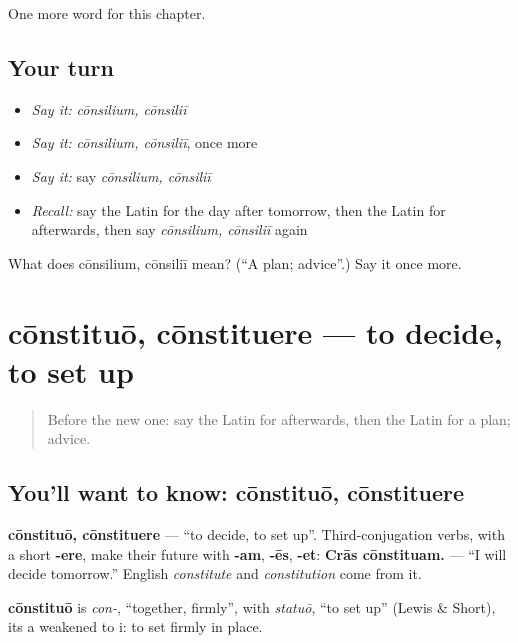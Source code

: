 \begin{grammarlens}[title={What you've built}]
One more word for this chapter.
\end{grammarlens}

\subsection*{Your turn}
\begin{itemize}
\raggedright
  \item \emph{Say it:} \emph{cōnsilium, cōnsiliī}
  \item \emph{Say it:} \emph{cōnsilium, cōnsiliī}, once more
  \item \emph{Say it:} say \emph{cōnsilium, cōnsiliī}
  \item \emph{Recall:} say the Latin for the day after tomorrow, then the Latin for afterwards, then say \emph{cōnsilium, cōnsiliī} again
\end{itemize}

\begin{tcolorbox}[breakable,colback=teal!4,colframe=teal!35!black,title={Before you move on}]
What does cōnsilium, cōnsiliī mean? (\textquotedblleft{}A plan; advice\textquotedblright{}.) Say it once more.
\end{tcolorbox}
\section[cōnstituō, cōnstituere]{cōnstituō, cōnstituere — to decide, to set up}

\label{lesson:LA-C163-constituo}



\begin{quote}
Before the new one: say the Latin for afterwards, then the Latin for a plan; advice.
\end{quote}

\subsection*{You'll want to know: cōnstituō, cōnstituere}
\textbf{cōnstituō, cōnstituere} — \textquotedblleft{}to decide, to set up\textquotedblright{}. Third-conjugation verbs, with a short \textbf{-ere}, make their future with \textbf{-am}, \textbf{-ēs}, \textbf{-et}: \textbf{Crās cōnstituam.} — \textquotedblleft{}I will decide tomorrow.\textquotedblright{} English \emph{constitute} and \emph{constitution} come from it.

\begin{cousinweb}
\textbf{cōnstituō} is \emph{con-}, \textquotedblleft{}together, firmly\textquotedblright{}, with \emph{statuō}, \textquotedblleft{}to set up\textquotedblright{} (Lewis \& Short), its a weakened to i: to set firmly in place.
\end{cousinweb}

